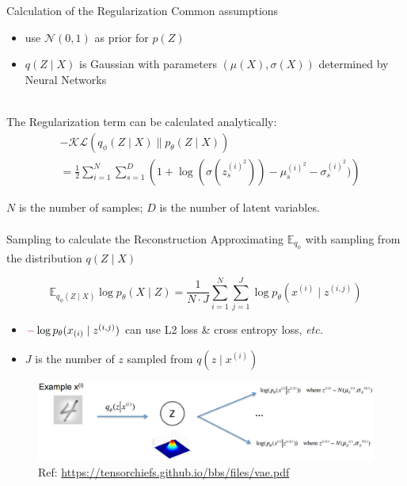 \documentclass{beamer}
\begin{document}
\begin{frame}{Calculation of the Regularization}
Common assumptions
\begin{itemize}
  \item use $\mathcal{N}(0,1)$ as prior for $p(Z)$
  \item $q(Z\mid X)$ is Gaussian with parameters $(\mu(X),\sigma(X))$ determined by Neural Networks
\end{itemize}
~\\
The \textcolor{DeepSkyBlue3}{ Regularization} term can be calculated analytically:
\begin{align*}
&-\mathcal{KL}(q_{\phi}(Z\mid X)\parallel p_{\theta}(Z\mid X))\\
&=\frac{1}{2} \sum_{i=1}^N \sum_{s=1}^D
\left(1+\log(\sigma(z_s^{{(i)}^2}))
-\mu_s^{{(i)}^2}
-\sigma_s^{{(i)}^2})\right)
\end{align*}

$N$ is the number of samples;
$D$ is the number of latent variables.
\begin{align*}
\end{align*}
\end{frame}
\begin{frame}{Sampling to calculate the Reconstruction}
Approximating $\mathbb{E}_{q_{\phi}}$ with sampling from the distribution $q(Z\mid X)$

$$\mathbb{E}_{q_{\phi}(Z\mid X)}\log{p_{\theta}(X \mid Z)}
= \frac{1}{N\cdot J} \sum_{i=1}^N \sum_{j=1}^J \log p_{\theta}(x^{(i)} \mid z^{(i,j)})$$

\begin{itemize}
    \item $\textcolor{DeepPink3}{\bf -}\log{p_{\theta}(x_{(i)} \mid z^{(i,j)})}$ can use L2 loss \& cross entropy loss, \textit{etc.}
    \item $J$ is the number of $z$ sampled from $q(z\mid x^{(i)})$
\end{itemize}

\begin{figure}
    \centering
    \includegraphics[width=0.95\columnwidth]{exp/regu+reco-2.png}
    \caption{\small \textcolor{BGpurple}
{Ref: \url{https://tensorchiefs.github.io/bbs/files/vae.pdf}}}
\end{figure}

\end{frame}
\end{document}
